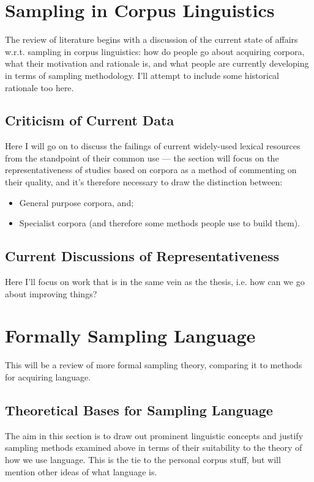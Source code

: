 
\section{Sampling in Corpus Linguistics}
The review of literature begins with a discussion of the current state of affairs w.r.t. sampling in corpus linguistics: how do people go about acquiring corpora, what their motivation and rationale is, and what people are currently developing in terms of sampling methodology.  I'll attempt to include some historical rationale too here.

\subsection{Criticism of Current Data}
Here I will go on to discuss the failings of current widely-used lexical resources from the standpoint of their common use --- the section will focus on the representativeness of studies based on corpora as a method of commenting on their quality, and it's therefore necessary to draw the distinction between:
\begin{itemize}
	\item General purpose corpora, and;
	\item Specialist corpora (and therefore some methods people use to build them).
\end{itemize}



\subsection{Current Discussions of Representativeness}
Here I'll focus on work that is in the same vein as the thesis, i.e. how can we go about improving things?



\section{Formally Sampling Language}
This will be a review of more formal sampling theory, comparing it to methods for acquiring language.

\subsection{Theoretical Bases for Sampling Language}
The aim in this section is to draw out prominent linguistic concepts and justify sampling methods examined above in terms of their suitability to the theory of how we use language.  This is the tie to the personal corpus stuff, but will mention other ideas of what language is.

